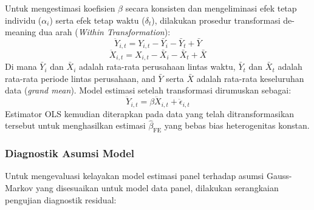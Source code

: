 \documentclass[12pt,a4paper]{article}
\begin{document}
Untuk mengestimasi koefisien \(\beta\) secara konsisten dan
mengeliminasi efek tetap individu (\(\alpha_i\)) serta efek tetap waktu
(\(\delta_t\)), dilakukan prosedur transformasi de-meaning dua arah
(\emph{Within Transformation}): \begin{equation}
\ddot{Y}_{i,t} = Y_{i,t} - \bar{Y}_i - \bar{Y}_t + \bar{Y}
\end{equation} \begin{equation}
\ddot{X}_{i,t} = X_{i,t} - \bar{X}_i - \bar{X}_t + \bar{X}
\end{equation} Di mana \(\bar{Y}_i\) dan \(\bar{X}_i\) adalah rata-rata
perusahaan lintas waktu, \(\bar{Y}_t\) dan \(\bar{X}_t\) adalah
rata-rata periode lintas perusahaan, and \(\bar{Y}\) serta \(\bar{X}\)
adalah rata-rata keseluruhan data (\emph{grand mean}). Model estimasi
setelah transformasi dirumuskan sebagai: \begin{equation}
\ddot{Y}_{i,t} = \beta \ddot{X}_{i,t} + \ddot{\epsilon}_{i,t}
\end{equation} Estimator OLS kemudian diterapkan pada data yang telah
ditransformasikan tersebut untuk menghasilkan estimasi
\(\hat{\beta}_{\mathrm{FE}}\) yang bebas bias heterogenitas konstan.

\subsubsection{Diagnostik Asumsi Model}\label{diagnostik-asumsi-model}

Untuk mengevaluasi kelayakan model estimasi panel terhadap asumsi
Gauss-Markov yang disesuaikan untuk model data panel, dilakukan
serangkaian pengujian diagnostik residual:
\end{document}
